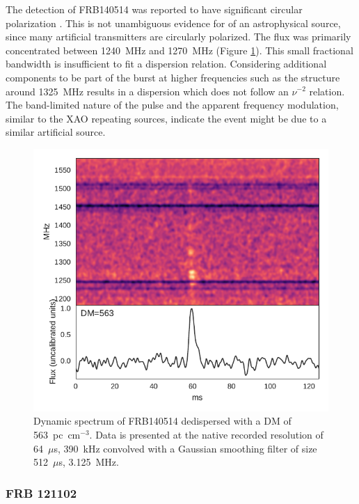 \documentclass[a4paper,fleqn,usenatbib]{mnras}
\begin{document}
The detection of FRB140514 was reported to have significant circular
polarization \citep{2015MNRAS.447..246P}.  This is not unambiguous evidence for
of an astrophysical source, since many artificial transmitters are circularly
polarized.  The flux was primarily concentrated between 1240~MHz and 1270~MHz
(Figure \ref{fig:FRB140514}). This small fractional bandwidth is insufficient to
fit a dispersion relation. Considering additional components to be part of the
burst at higher frequencies such as the structure around 1325~MHz results in a
dispersion which does not follow an $\nu^{-2}$ relation. The band-limited nature
of the pulse and the apparent frequency modulation, similar to the XAO repeating
sources, indicate the event might be due to a similar artificial source. 





\begin{figure}
    \includegraphics[width=1.0\linewidth]{figures/FRB140514.pdf}
    \caption{Dynamic spectrum of FRB140514 dedispersed with a DM of
    563~pc~cm$^{-3}$.  Data is presented at the native recorded resolution of
    64~$\mu$s, 390~kHz convolved with a Gaussian smoothing filter of size
    512~$\mu$s, 3.125~MHz.
    }
    \label{fig:FRB140514}
\end{figure}

\subsubsection{FRB 121102}
\end{document}
